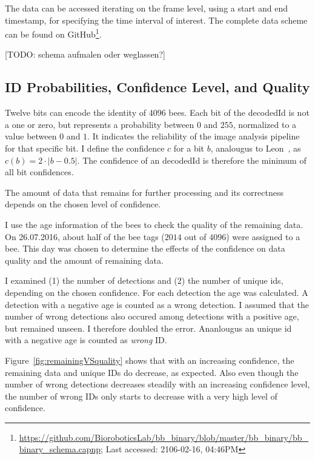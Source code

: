 The data can be accessed iterating on the frame level, using a start and end timestamp, for specifying the time interval of interest. The complete data scheme can be found on GitHub\footnote{\url{https://github.com/BioroboticsLab/bb_binary/blob/master/bb_binary/bb_binary_schema.capnp}; Last accessed: 2106-02-16, 04:46PM}. 

[TODO: schema aufmalen oder weglassen?]\\

\subsection{ID Probabilities, Confidence Level, and Quality}
\label{subsec:confidence}

Twelve bits can encode the identity of 4096 bees.
Each bit of the decodedId is not a one or zero, but represents a probability between $0$ and $255$, normalized to a value between $0$ and $1$. It indicates the reliability of the image analysis pipeline for that specific bit.
I define the confidence $c$ for a bit $b$, analougus to Leon~\textcite[p.~14]{leon2016}, as $c(b)=2\cdot|b-0.5|$. The confidence of an decodedId is therefore the minimum of all bit confidences.

The amount of data that remains for further processing and its correctness depends on the chosen level of confidence.

I use the age information of the bees to check the quality of the remaining data. On 26.07.2016, about half of the bee tags ($2014$ out of $4096$) were assigned to a bee. This day was chosen to determine the effects of the confidence on data quality and the amount of remaining data.

I examined (1) the number of detections and (2) the number of unique ids, depending on the chosen confidence.
For each detection the age was calculated. A detection with a negative age is counted as a wrong detection. I assumed that the number of wrong detections also occured among detections with a positive age, but remained unseen. I therefore doubled the error.
Ananlougus an unique id with a negative age is counted as \emph{wrong} ID.

Figure~\ref{fig:remainingVSquality} shows that with an increasing confidence, the remaining data and unique IDs do decrease, as expected. Also even though the number of wrong detections decreases steadily with an increasing confidence level, the number of wrong IDs only starts to decrease with a very high level of confidence.

